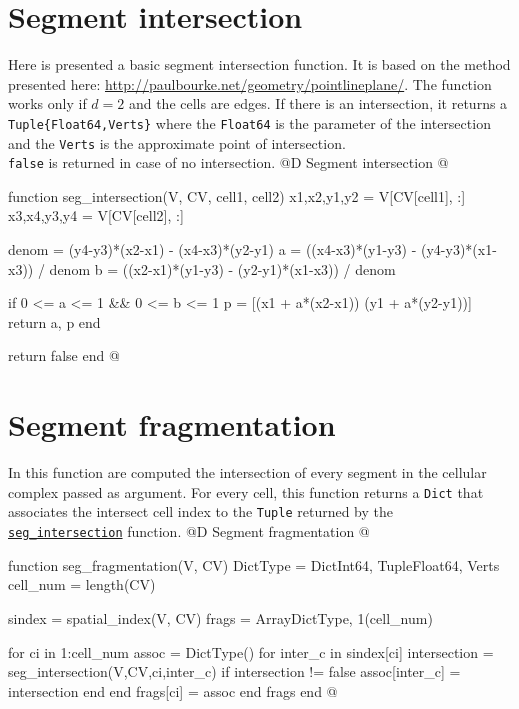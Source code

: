 \documentclass[10pt,oneside]{article}
\begin{document}
\section{Segment intersection}
\label{seg_intersection}
Here is presented a basic segment intersection function.
It is based on the method presented here: \url{http://paulbourke.net/geometry/pointlineplane/}.
The function works only if $d=2$ and the cells are edges.
If there is an intersection, it returns a \texttt{Tuple\{Float64,Verts\}} where 
the \texttt{Float64} is the parameter of the intersection and the \texttt{Verts} 
is the approximate point of intersection. \\
\texttt{false} is returned in case of no intersection.
@D Segment intersection
@{function seg_intersection(V, CV, cell1, cell2)
    x1,x2,y1,y2 = V[CV[cell1], :]
    x3,x4,y3,y4 = V[CV[cell2], :]

    denom = (y4-y3)*(x2-x1) - (x4-x3)*(y2-y1)
    a = ((x4-x3)*(y1-y3) - (y4-y3)*(x1-x3)) / denom
    b = ((x2-x1)*(y1-y3) - (y2-y1)*(x1-x3)) / denom

    if 0 <= a <= 1 && 0 <= b <= 1
        p = [(x1 + a*(x2-x1))  (y1 + a*(y2-y1))]
        return a, p
    end

    return false
end
@}

\section{Segment fragmentation}
In this function are computed the intersection of every segment in the 
cellular complex passed as argument. For every cell, this function returns a
\texttt{Dict} that associates the intersect cell index to the \texttt{Tuple}
returned by the \hyperref[seg_intersection]{\texttt{seg\_intersection}} function.
@D Segment fragmentation
@{function seg_fragmentation(V, CV)
    DictType = Dict{Int64, Tuple{Float64, Verts}}
    cell_num = length(CV)

    sindex = spatial_index(V, CV)
    frags = Array{DictType, 1}(cell_num)

    for ci in 1:cell_num
        assoc = DictType()
        for inter_c in sindex[ci]
            intersection = seg_intersection(V,CV,ci,inter_c)
            if intersection != false
                assoc[inter_c] = intersection
            end
        end
        frags[ci] = assoc
    end
    frags
end
@}

\end{document}
